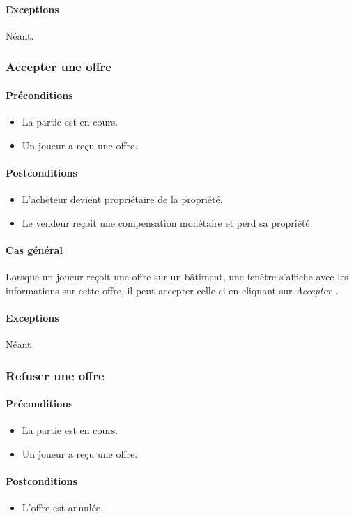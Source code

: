 \documentclass[a4paper,11pt]{report}
\begin{document}
\paragraph{Exceptions} Néant.
\subsubsection{Accepter une offre}
\paragraph{Préconditions}
\begin{itemize}
 \item La partie est en cours.
 \item Un joueur a reçu une offre.
\end{itemize}
\paragraph{Postconditions}
\begin{itemize}
 \item L'acheteur devient propriétaire de la propriété.
 \item Le vendeur reçoit une compensation monétaire et perd sa propriété.
\end{itemize}
\paragraph{Cas général}
Lorsque un joueur reçoit une offre sur un bâtiment, une fenêtre s'affiche avec les informations sur cette offre, il peut accepter celle-ci en cliquant sur \og \textit{Accepter} \fg.
\paragraph{Exceptions} Néant
\subsubsection{Refuser une offre}
\paragraph{Préconditions}
\begin{itemize}
 \item La partie est en cours.
 \item Un joueur a reçu une offre.
\end{itemize}
\paragraph{Postconditions}
\begin{itemize}
 \item L'offre est annulée.
\end{itemize}
\end{document}
